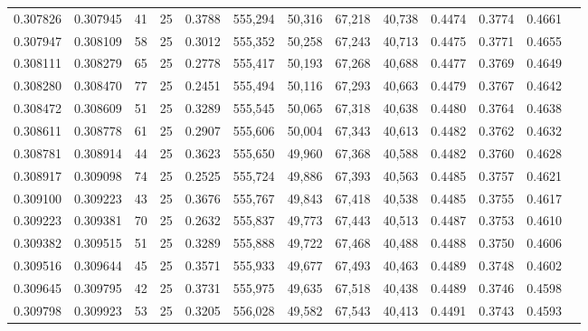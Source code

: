 \begin{tabular}{rrrrrrrrrrrrr}
0.307826 & 0.307945 &    41 &  25 &                                     0.3788 & 555,294 &  50,316 &  67,218 &  40,738 & 0.4474 & 0.3774 & 0.4661 \\
0.307947 & 0.308109 &    58 &  25 &                                     0.3012 & 555,352 &  50,258 &  67,243 &  40,713 & 0.4475 & 0.3771 & 0.4655 \\
0.308111 & 0.308279 &    65 &  25 &                                     0.2778 & 555,417 &  50,193 &  67,268 &  40,688 & 0.4477 & 0.3769 & 0.4649 \\
0.308280 & 0.308470 &    77 &  25 &                                     0.2451 & 555,494 &  50,116 &  67,293 &  40,663 & 0.4479 & 0.3767 & 0.4642 \\
0.308472 & 0.308609 &    51 &  25 &                                     0.3289 & 555,545 &  50,065 &  67,318 &  40,638 & 0.4480 & 0.3764 & 0.4638 \\
0.308611 & 0.308778 &    61 &  25 &                                     0.2907 & 555,606 &  50,004 &  67,343 &  40,613 & 0.4482 & 0.3762 & 0.4632 \\
0.308781 & 0.308914 &    44 &  25 &                                     0.3623 & 555,650 &  49,960 &  67,368 &  40,588 & 0.4482 & 0.3760 & 0.4628 \\
0.308917 & 0.309098 &    74 &  25 &                                     0.2525 & 555,724 &  49,886 &  67,393 &  40,563 & 0.4485 & 0.3757 & 0.4621 \\
0.309100 & 0.309223 &    43 &  25 &                                     0.3676 & 555,767 &  49,843 &  67,418 &  40,538 & 0.4485 & 0.3755 & 0.4617 \\
0.309223 & 0.309381 &    70 &  25 &                                     0.2632 & 555,837 &  49,773 &  67,443 &  40,513 & 0.4487 & 0.3753 & 0.4610 \\
0.309382 & 0.309515 &    51 &  25 &                                     0.3289 & 555,888 &  49,722 &  67,468 &  40,488 & 0.4488 & 0.3750 & 0.4606 \\
0.309516 & 0.309644 &    45 &  25 &                                     0.3571 & 555,933 &  49,677 &  67,493 &  40,463 & 0.4489 & 0.3748 & 0.4602 \\
0.309645 & 0.309795 &    42 &  25 &                                     0.3731 & 555,975 &  49,635 &  67,518 &  40,438 & 0.4489 & 0.3746 & 0.4598 \\
0.309798 & 0.309923 &    53 &  25 &                                     0.3205 & 556,028 &  49,582 &  67,543 &  40,413 & 0.4491 & 0.3743 & 0.4593 \\

\end{tabular}
